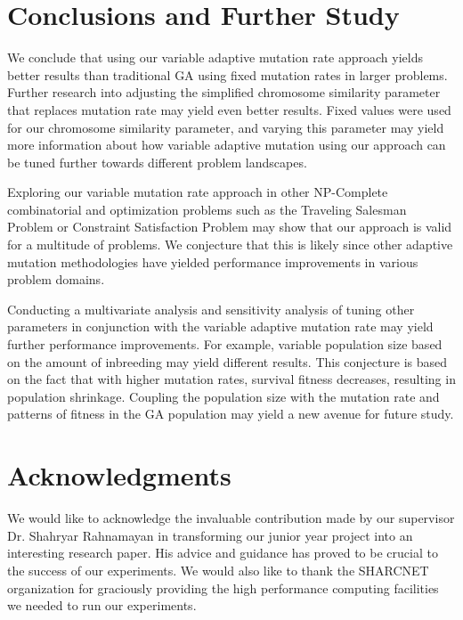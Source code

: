\documentclass{sig-alternate}
\begin{document}
% 
%
\section{Conclusions and Further Study}
We conclude that using our variable adaptive mutation rate approach yields better results than traditional GA using fixed mutation rates in larger problems. Further research into adjusting the simplified chromosome similarity parameter that replaces mutation rate may yield even better results. Fixed values were used for our chromosome similarity parameter, and varying this parameter may yield more information about how variable adaptive mutation using our approach can be tuned further towards different problem landscapes.

Exploring our variable mutation rate approach in other NP-Complete combinatorial and optimization problems such as the Traveling Salesman Problem or Constraint Satisfaction Problem may show that our approach is valid for a multitude of problems. We conjecture that this is likely since other adaptive mutation methodologies have yielded performance improvements in various problem domains.

Conducting a multivariate analysis and sensitivity analysis of tuning other parameters in conjunction with the variable adaptive mutation rate may yield further performance improvements. For example, variable population size based on the amount of inbreeding may yield different results. This conjecture is based on the fact that with higher mutation rates, survival fitness decreases, resulting in population shrinkage. Coupling the population size with the mutation rate and patterns of fitness in the GA population may yield a new avenue for future study.

\section{Acknowledgments}
We would like to acknowledge the invaluable contribution made by our supervisor Dr. Shahryar Rahnamayan in transforming our junior year project into an interesting research paper. His advice and guidance has proved to be crucial to the success of our experiments. We would also like to thank the SHARCNET organization for graciously providing the high performance computing facilities we needed to run our experiments.


%
%
\end{document}
